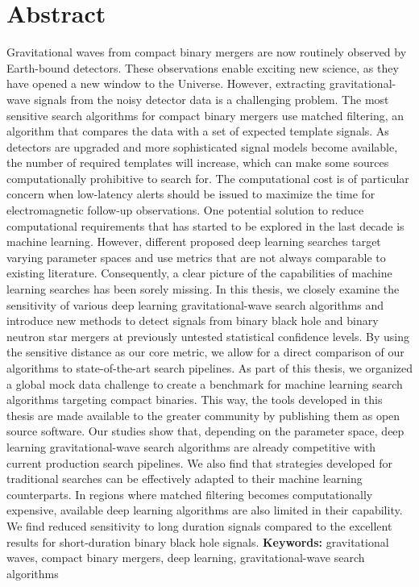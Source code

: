 \chapter{Abstract}
\vspace*{-0.75cm}
Gravitational waves from compact binary mergers are now routinely observed by Earth-bound detectors. These observations enable exciting new science, as they have opened a new window to the Universe.
However, extracting gravitational-wave signals from the noisy detector data is a challenging problem. The most sensitive search algorithms for compact binary mergers use matched filtering, an algorithm that compares the data with a set of expected template signals. As detectors are upgraded and more sophisticated signal models become available, the number of required templates will increase, which can make some sources computationally prohibitive to search for. The computational cost is of particular concern when low-latency alerts should be issued to maximize the time for electromagnetic follow-up observations. One potential solution to reduce computational requirements that has started to be explored in the last decade is machine learning. However, different proposed deep learning searches target varying parameter spaces and use metrics that are not always comparable to existing literature. Consequently, a clear picture of the capabilities of machine learning searches has been sorely missing.
In this thesis, we closely examine the sensitivity of various deep learning gravitational-wave search algorithms and introduce new methods to detect signals from binary black hole and binary neutron star mergers at previously untested statistical confidence levels. By using the sensitive distance as our core metric, we allow for a direct comparison of our algorithms to state-of-the-art search pipelines. As part of this thesis, we organized a global mock data challenge to create a benchmark for machine learning search algorithms targeting compact binaries. This way, the tools developed in this thesis are made available to the greater community by publishing them as open source software.
Our studies show that, depending on the parameter space, deep learning gravitational-wave search algorithms are already competitive with current production search pipelines. We also find that strategies developed for traditional searches can be effectively adapted to their machine learning counterparts. In regions where matched filtering becomes computationally expensive, available deep learning algorithms are also limited in their capability. We find reduced sensitivity to long duration signals compared to the excellent results for short-duration binary black hole signals.
\clearpage
\thispagestyle{plain}
\textbf{Keywords:} gravitational waves, compact binary mergers, deep learning, gravitational-wave search algorithms
\thispagestyle{plain}
